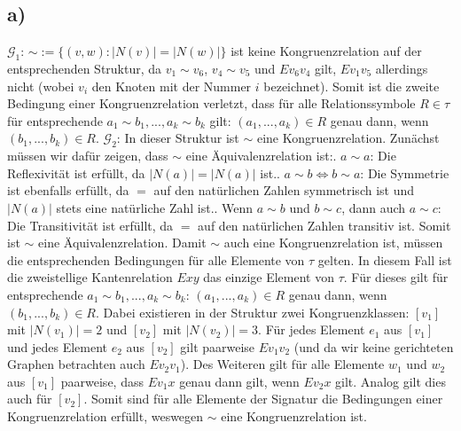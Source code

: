 \documentclass[11pt, a4paper]{article}
\begin{document}
\subsection*{a)}
$\mathcal{G}_1$: $\sim := \{(v,w) : |N(v)| = |N(w)|\}$ ist keine Kongruenzrelation auf der entsprechenden Struktur, da $v_1\sim v_6$, $v_4\sim v_5$ und $Ev_6v_4$ gilt, $Ev_1v_5$ allerdings nicht (wobei $v_i$ den Knoten mit der Nummer $i$ bezeichnet). Somit ist die zweite Bedingung einer Kongruenzrelation verletzt, dass für alle Relationssymbole $R\in \tau$ für entsprechende $a_1\sim b_1,...,a_k\sim b_k$ gilt:\newline
$(a_1,...,a_k) \in R$ genau dann, wenn $(b_1,...,b_k) \in R$.\newline\newline
$\mathcal{G}_2$: In dieser Struktur ist $\sim$ eine Kongruenzrelation.\newline
Zunächst müssen wir dafür zeigen, dass $\sim$ eine Äquivalenzrelation ist:. $a \sim a$: Die Reflexivität ist erfüllt, da $|N(a)| = |N(a)|$ ist.. $a \sim b \iff b \sim a$: Die Symmetrie ist ebenfalls erfüllt, da $=$ auf den natürlichen Zahlen symmetrisch ist und $|N(a)|$ stets eine natürliche Zahl ist.. Wenn $a \sim b$ und $b \sim c$, dann auch $a \sim c$: Die Transitivität ist erfüllt, da $=$ auf den natürlichen Zahlen transitiv ist.\newline
Somit ist $\sim$ eine Äquivalenzrelation.\newline
Damit $\sim$ auch eine Kongruenzrelation ist, müssen die entsprechenden Bedingungen für alle Elemente von $\tau$ gelten. In diesem Fall ist die zweistellige Kantenrelation $Exy$ das einzige Element von $\tau$. Für dieses gilt für entsprechende $a_1\sim b_1,...,a_k\sim b_k$:\newline
$(a_1,...,a_k) \in R$ genau dann, wenn $(b_1,...,b_k) \in R$.\newline
Dabei existieren in der Struktur zwei Kongruenzklassen:\newline
$[v_1]$ mit $|N(v_1)| = 2$ und $[v_2]$ mit $|N(v_2)| = 3$. Für jedes Element $e_1$ aus $[v_1]$ und jedes Element $e_2$ aus $[v_2]$ gilt paarweise $Ev_1v_2$ (und da wir keine gerichteten Graphen betrachten auch $Ev_2v_1$). Des Weiteren gilt für alle Elemente $w_1$ und $w_2$ aus $[v_1]$ paarweise, dass $Ev_1x$ genau dann gilt, wenn $Ev_2x$ gilt. Analog gilt dies auch für $[v_2]$.\newline
Somit sind für alle Elemente der Signatur die Bedingungen einer Kongruenzrelation erfüllt, weswegen $\sim$ eine Kongruenzrelation ist.\newline
\end{document}
